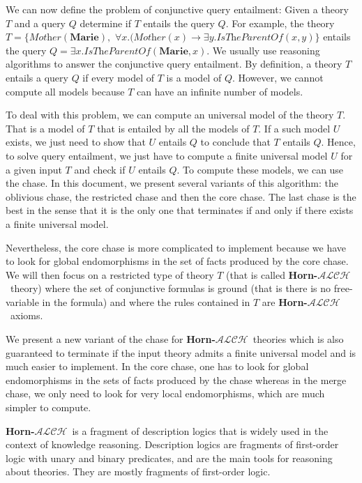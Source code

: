 \documentclass{article}
\theoremstyle{definition}
\theoremstyle{remark}
\newcommand{\ALCH}{\textbf{Horn-$\mathcal{ALCH}$}}
\begin{document}
We can now define the problem of conjunctive query entailment: Given a theory $T$ and a query $Q$ determine if $T$ entails the query $Q$. For example, the theory $T= \{\textit{Mother}(\textbf{Marie}),$ $\forall x.(\textit{Mother}(x) \rightarrow \exists y.\textit{IsTheParentOf}(x,y)\}$ entails the query $Q=\exists x.\textit{IsTheParentOf}(\textbf{Marie},x)$. We usually use reasoning algorithms to answer the conjunctive query entailment. By definition, a theory $T$ entails a query $Q$ if every  model of $T$ is a model of $Q$. However, we cannot compute all models because $T$ can have an infinite number of models.

To deal with this problem, we can compute an universal model of the theory $T$. That is a model of $T$ that is entailed by all the models of $T$. If a such model $U$ exists, we just need to show that $U$ entails $Q$ to conclude that $T$ entails $Q$. Hence, to solve query entailment, we just have to compute a finite universal model $U$ for a given input $T$ and check if $U$ entails $Q$. To compute these models, we can use the chase. In this document, we present several variants of this algorithm: the oblivious chase, the restricted chase and then the core chase. The last chase is the best in the sense that it is the only one that terminates if and only if there exists a finite universal model.

Nevertheless, the core chase is more complicated to implement because we have to look for global endomorphisms in the set of facts produced by the core chase. We will then focus on a restricted type of theory $T$ (that is called \ALCH\ theory) where the set of conjunctive formulas is ground (that is there is no free-variable in the formula) and where the rules contained in $T$ are \ALCH\ axioms.

We present a new variant of the chase for \ALCH\ theories which is also guaranteed to terminate if the input theory admits a finite universal model and is much easier to implement. In the core chase, one has to look for global endomorphisms in the sets of facts produced by the chase whereas in the merge chase, we only need to look for very local endomorphisms, which are much simpler to compute.

\ALCH\ is a fragment of description logics that is widely used in the context of
knowledge reasoning.  Description logics are fragments of first-order logic with unary and binary predicates, and are the main tools for reasoning about theories. They are mostly fragments of first-order logic.
\end{document}
